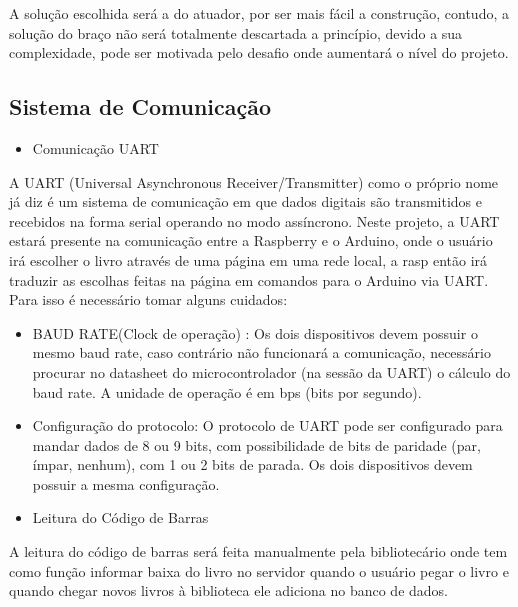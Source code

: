 A solução escolhida será a do atuador, por ser mais fácil a construção, contudo, a solução do braço  não será totalmente descartada a princípio, devido a sua complexidade, pode ser motivada pelo desafio onde aumentará o nível do projeto.

\subsection{Sistema de Comunicação}

\begin{itemize}
\item{Comunicação UART}
\end{itemize}

A UART (Universal Asynchronous Receiver/Transmitter) como o próprio nome já diz é um sistema de comunicação em que dados digitais são transmitidos e recebidos na forma serial operando no modo assíncrono. Neste projeto, a UART estará presente na comunicação entre a Raspberry e o Arduino, onde o usuário irá escolher o livro através de uma página em uma rede local, a rasp então irá traduzir as escolhas feitas na página em comandos para o Arduino via UART. Para isso é necessário tomar alguns cuidados:

\begin{itemize}
\item BAUD RATE(Clock de operação) : Os dois dispositivos devem possuir o mesmo baud rate, caso contrário não funcionará a comunicação, necessário procurar no datasheet do microcontrolador (na sessão da UART) o cálculo do baud rate. A unidade de operação é em bps (bits por segundo).
\item Configuração do protocolo: O protocolo de UART pode ser configurado para mandar dados de 8 ou 9 bits, com possibilidade de bits de paridade (par, ímpar, nenhum), com 1 ou 2 bits de parada. Os dois dispositivos devem possuir a mesma configuração.
\end{itemize}

\begin{itemize}
\item{Leitura do Código de Barras}
\end{itemize}

A leitura do código de barras será feita manualmente pela bibliotecário onde tem como função informar baixa do livro no servidor quando o usuário pegar o livro e quando chegar novos livros à biblioteca ele adiciona no banco de dados. 

